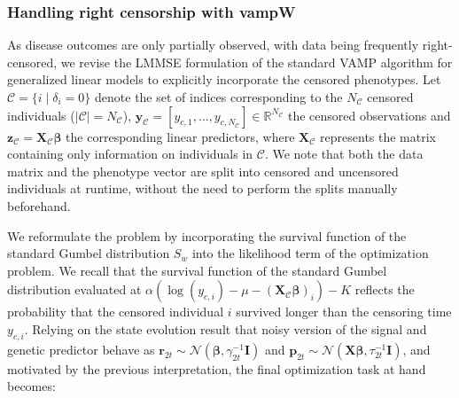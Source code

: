\subsubsection{Handling right censorship with vampW}
As disease outcomes are only partially observed, with data being frequently right-censored, we revise the LMMSE formulation of the standard VAMP algorithm for generalized linear models to explicitly incorporate the censored phenotypes. Let $\mathcal{C} = \{i \mid \delta_i = 0\}$ denote the set of indices corresponding to the $N_{\mathcal C}$ censored individuals ($|\mathcal C|=N_{\mathcal C}$), $\bm{y}_\mathcal{C}=[y_{c, 1}, \ldots, y_{c, N_{\mathcal C}}]\in \mathbb R^{N_{\mathcal C}}$  the censored observations and $\bm{z}_\mathcal{C} = \bm{X}_\mathcal{C} \bm{\beta}$ the corresponding linear predictors, where $\bm{X}_\mathcal{C}$ represents the matrix containing only information on individuals in $\mathcal{C}$. We note that both the data matrix and the phenotype vector are split into censored and uncensored individuals at runtime, without the need to perform the splits manually beforehand. 

We reformulate the problem by incorporating the survival function of the standard Gumbel distribution $S_w$ into the likelihood term of the optimization problem. We recall that the survival function of the standard Gumbel distribution evaluated at $\alpha\left(\log(y_{c,i}) - \mu - (\bm{X}_\mathcal{C} \bm{\beta})_i \right) -K$ reflects the probability that the censored individual $i$ survived longer than the censoring time $y_{c, i}$. Relying on the state evolution result that noisy version of the signal and genetic predictor behave as $\bm{r}_{2t} \sim \mathcal{N}(\bm{\beta},\gamma_{2t}^{-1}\bm{I})$ and $\bm{p}_{2t} \sim \mathcal{N}(\bm{X}\bm{\beta},\tau_{2t}^{-1}\bm{I})$, and motivated by the previous interpretation, the final optimization task at hand becomes:

